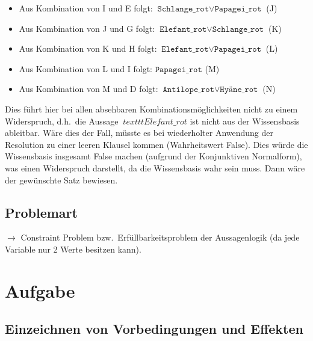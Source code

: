 \documentclass[a4paper,draft=false,oneside,12pt,ngerman]{scrreprt}
\begin{document}
\begin{itemize}
    \item Aus Kombination von I und E folgt: $ \texttt{Schlange\_rot} \lor \texttt{Papagei\_rot} $ (J)
    \item Aus Kombination von J und G folgt: $ \texttt{Elefant\_rot} \lor \texttt{Schlange\_rot} $ (K)
    \item Aus Kombination von K und H folgt: $ \texttt{Elefant\_rot} \lor \texttt{Papagei\_rot} $ (L)
    \item Aus Kombination von L und I folgt: $ \texttt{Papagei\_rot} $ (M)
    \item Aus Kombination von M und D folgt: $ \texttt{Antilope\_rot} \lor \texttt{Hyäne\_rot} $ (N)
\end{itemize}

Dies führt hier bei allen absehbaren Kombinationsmöglichkeiten nicht zu einem
Widerspruch, d.h.\ die Aussage $\ texttt{Elefant\_rot} $ ist nicht aus der
Wissensbasis ableitbar. Wäre dies der Fall, müsste es bei wiederholter Anwendung
der Resolution zu einer leeren Klausel kommen (Wahrheitswert False). Dies würde
die Wissensbasis insgesamt False machen (aufgrund der Konjunktiven Normalform),
was einen Widerspruch darstellt, da die Wissensbasis wahr sein muss. Dann wäre
der gewünschte Satz bewiesen.

\section{Problemart}
\label{sec:problemart}

$\rightarrow$ Constraint Problem bzw.\ Erfüllbarkeitsproblem der Aussagenlogik
(da jede Variable nur 2 Werte besitzen kann).

\chapter{Aufgabe}
\label{chp:aufgabe}

\section{Einzeichnen von Vorbedingungen und Effekten}
\label{sec:einzeichnen_von_vorbedingungen_und_effekten}
\end{document}
